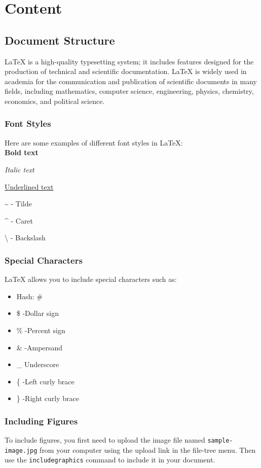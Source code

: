 \documentclass{article}
\begin{document}
\textcolor{blue}{\tableofcontents}
 \section*{Content}

\subsection{Document Structure}

LaTeX is a high-quality typesetting system; it includes features designed for the production of technical and scientific documentation. LaTeX is widely used in academia for the communication and publication of scientific documents in many fields, including mathematics, computer science, engineering, physics, chemistry, economics, and political science.

\subsubsection{Font Styles}
Here are some examples of different font styles in LaTeX: \\
\textbf{Bold text}

\textit{Italic text}

\underline{Underlined text}

\textasciitilde{} - Tilde

\textasciicircum{} - Caret

\textbackslash{} - Backslash

\subsubsection{Special Characters}
LaTeX allows you to include special characters such as:
\begin{itemize}
    \item Hash: \#
    \item \$ -Dollar sign 
    \item \% -Percent sign
    \item \& -Ampersand
    \item \_ Underscore
    \item  \{ -Left curly brace
    \item \} -Right curly brace
\end{itemize}

\subsubsection{Including Figures}
To include figures, you first need to upload the image file named \texttt{sample-image.jpg} from your computer using the upload link in the file-tree menu. Then use the \texttt{includegraphics} command to include it in your document.
\end{document}
